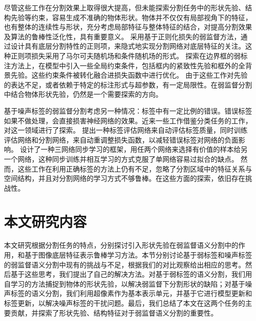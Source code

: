 尽管这些工作在分割效果上取得很大提高，但未能探索分割任务中的形状先验、结构先验等约束，容易生成不准确的物体形状。物体并不仅仅有局部视角下的特征，也有整体的连续性与形状，充分考虑局部特征与整体特征的结合，对提高分割效果及算法的鲁棒性泛化性，具有重要意义。
\citet{tang2018regularized} 采用基于正则化损失的弱监督方法，通过设计具有底层分割特性的正则项，来隐式地实现分割网络对底层特征的关注。这种正则项损失采用了马尔可夫随机场和条件随机场的形式。
\citet{kervadec2020bounding} 探索在边界框的弱标注方法上，在模型中引入一些全局约束条件，包括框内的紧致性先验和框外的全背景先验。这些约束条件被转化融合进损失函数中进行优化。
由于这些工作对先验的表达不足，或者依赖于特定的标注形式与超参数，有一定局限性。在弱监督分割中结合物体形状先验，仍然是一个需要探索的方向。

基于噪声标签的弱监督分割考虑另一种情况：标签中有一定比例的错误。错误标签如果不做处理，会直接损害神经网络的效果。近来一些工作借鉴分类任务的工作，对这一领域进行了探索。
\citet{Zhu2019PickandLearnAQ} 提出一种标签评估网络来自动评估标签质量，同时训练评估网络和分割网络，来自动重调整损失函数，以减轻错误标签对网络的负面影响。
\citet{Zhang2020RobustMI} 设计了一种三网络同步学习的框架，用任两个网络来选择有价值的样本给另一个网络，这种同步训练并相互学习的方式克服了单网络容易过拟合的缺点。
然而，这些工作在利用正确标签的方法上仍有不足，忽略了分割区域中的特征关系与空间结构，并且对分割网络的学习方式不够鲁棒。在这些方面的探索，依旧存在挑战性。

\section{本文研究内容}
本文研究根据分割任务的特点，分别探讨引入形状先验在弱监督语义分割中的作用，和基于图像底层特征表示鲁棒学习方法。本节分别讨论基于弱标签和噪声标签的弱监督语义分割中现有的挑战与不足，根据我们的对比观察给出相应的思考。然后基于这些思考，我们提出了自己的解决方法。对基于弱标签的语义分割，我们用自学习的方法捕捉到物体的形状先验，以解决弱监督下分割形状的缺陷；对基于噪声标签的语义分割，我们利用超像素作为基本表示单元，并基于它进行模型更新和标签更新，以解决噪声标签的干扰问题。最后，我们总结了本文在这两个任务的主要贡献，并探索了形状先验、结构特征对于弱监督语义分割的重要性。

